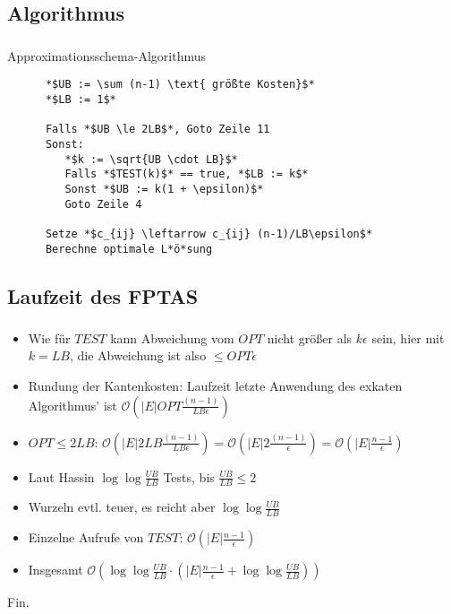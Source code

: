 \documentclass{beamer}
\begin{document}
\subsection{Algorithmus}

\begin{frame}[fragile]
   \frametitle{\insertsection}
   \framesubtitle{\insertsubsection}
   \begin{block}{Approximationsschema-Algorithmus}
      \begin{lstlisting}
      *$UB := \sum (n-1) \text{ größte Kosten}$*
      *$LB := 1$*

      Falls *$UB \le 2LB$*, Goto Zeile 11
      Sonst:
         *$k := \sqrt{UB \cdot LB}$*
         Falls *$TEST(k)$* == true, *$LB := k$*
         Sonst *$UB := k(1 + \epsilon)$*
         Goto Zeile 4

      Setze *$c_{ij} \leftarrow c_{ij} (n-1)/LB\epsilon$*
      Berechne optimale L*ö*sung
      \end{lstlisting}
   \end{block}
\end{frame}

\subsection{Laufzeit des FPTAS}
\begin{frame}
   \frametitle{\insertsection}
   \framesubtitle{\insertsubsection}
   \begin{itemize}[<+->]
      \item Wie für $TEST$ kann Abweichung vom $OPT$ nicht größer
         als $k\epsilon$ sein, hier mit $k=LB$, die Abweichung ist also $\le
         OPT\epsilon$
      \item Rundung der Kantenkosten: Laufzeit letzte Anwendung
         des exkaten Algorithmus' ist $\mathcal{O}\left(|E| OPT\frac{(n-1)}{LB\epsilon}\right)$
      \item $OPT \le 2LB$: $\mathcal{O}(|E| 2LB\frac{(n-1)}{LB\epsilon})=\mathcal{O}(|E|
         2\frac{(n-1)}{\epsilon})=\mathcal{O}\left(|E|\frac{n-1}{\epsilon}\right)$
      \item Laut Hassin $\log{\log{\frac{UB}{LB}}}$ Tests, bis $\frac{UB}{LB} \le 2$
         \earth
      \item Wurzeln evtl. teuer, es reicht aber $\log{\log{\frac{UB}{LB}}}$ \earth
      \item Einzelne Aufrufe von $TEST$: $\mathcal{O}\left(|E|\frac{n-1}{\epsilon}\right)$
      \item Insgesamt $\mathcal{O}(\log\log{\frac{UB}{LB}\cdot(|E|\frac{n-1}{\epsilon} +
         \log\log{\frac{UB}{LB}})})$
   \end{itemize}
\end{frame}

\begin{frame}
   \centerline{Fin.}
\end{frame}
\end{document}
